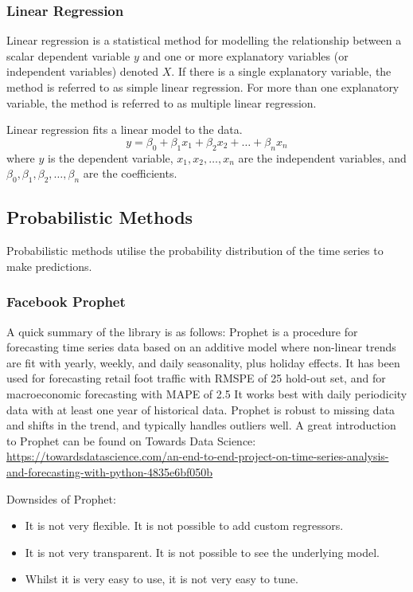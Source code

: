 \documentclass[manuscript,screen,nonacm]{acmart}
\numberwithin{equation}{section}
\begin{document}
\subsubsection{Linear Regression}
Linear regression is a statistical method for modelling the relationship between a scalar dependent variable $y$ and one or more explanatory variables (or independent variables) denoted $X$.
If there is a single explanatory variable, the method is referred to as simple linear regression. For more than one explanatory variable, the method is referred to as multiple linear regression.

Linear regression fits a linear model to the data.
\begin{equation}
\label{eq:linear_regression}
y = \beta_0 + \beta_1 x_1 + \beta_2 x_2 + \dots + \beta_n x_n
\end{equation}
where $y$ is the dependent variable, $x_1, x_2, \dots, x_n$ are the independent variables, and $\beta_0, \beta_1, \beta_2, \dots, \beta_n$ are the coefficients.


\subsection{Probabilistic Methods}
Probabilistic methods utilise the probability distribution of the time series to make predictions.

\subsubsection{Facebook Prophet}
A quick summary of the library is as follows: 
    Prophet is a procedure for forecasting time series data based on an additive model 
    where non-linear trends are fit with yearly, weekly, and daily seasonality, plus 
    holiday effects.
    It has been used for forecasting retail foot traffic with RMSPE of 25%
    hold-out set, and for macroeconomic forecasting with MAPE of 2.5%
    It works best with daily periodicity data with at least one year of historical data.
    Prophet is robust to missing data and shifts in the trend, and typically handles outliers
    well.
    A great introduction to Prophet can be found on Towards Data Science:
    \url{https://towardsdatascience.com/an-end-to-end-project-on-time-series-analysis-and-forecasting-with-python-4835e6bf050b}


Downsides of Prophet:
\begin{itemize}
	\item It is not very flexible. It is not possible to add custom regressors.
	\item It is not very transparent. It is not possible to see the underlying model.
	\item Whilst it is very easy to use, it is not very easy to tune.
\end{itemize}
\end{document}
